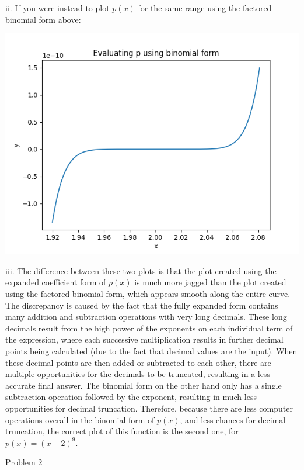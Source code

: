 \documentclass[9pt]{article}
\begin{document}
   
   ii. If you were instead to plot $p(x)$ for the same range using the factored binomial form above:
   
   \begin{center}
   	\includegraphics[scale=0.5]{1ii}
   \end{center}
   
   iii. The difference between these two plots is that the plot created using the expanded coefficient form of $p(x)$ is much more jagged than the plot created using the factored binomial form, which appears smooth along the entire curve. The discrepancy is caused by the fact that the fully expanded form contains many addition and subtraction operations with very long decimals. These long decimals result from the high power of the exponents on each individual term of the expression, where each successive multiplication results in further decimal points being calculated (due to the fact that decimal values are the input). When these decimal points are then added or subtracted to each other, there are multiple opportunities for the decimals to be truncated, resulting in a less accurate final answer. The binomial form on the other hand only has a single subtraction operation followed by the exponent, resulting in much less opportunities for decimal truncation. Therefore, because there are less computer operations overall in the binomial form of $p(x)$, and less chances for decimal truncation, the correct plot of this function is the second one, for $p(x) = (x-2)^9$.
   

\newpage

\item Problem 2
\end{document}
